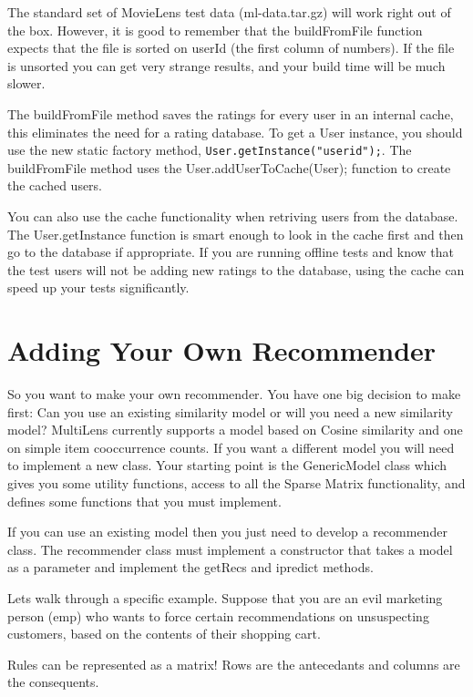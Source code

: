 \documentclass[12pt]{article}
\begin{document}
The standard set of MovieLens test data (ml-data.tar.gz) will work
right out of the box.  However, it is good to remember that the
buildFromFile function expects that the file is sorted on userId (the
first column of numbers).  If the file is unsorted you can get
very strange results, and your build time will be much slower.


The buildFromFile method saves the ratings for every user in an
internal cache, this eliminates the need for a rating database.  To
get a User instance, you should use the new static factory method, 
\lstinline$User.getInstance("userid");$.  The buildFromFile method
uses the User.addUserToCache(User); function to create the cached
users. 

You can also use the cache functionality when retriving users from
the database.  The User.getInstance function is smart enough to look
in the cache first and then go to the database if appropriate.  If you
are running offline tests and know that the test users will not be
adding new ratings to the database, using the cache can speed up your
tests significantly.


\section{Adding Your Own Recommender}
\label{sec:newrec}

So you want to make your own recommender.  You have one big decision
to make first: Can you use an existing similarity model or will you
need a new similarity model?  MultiLens currently supports a model
based on Cosine similarity and one on simple item cooccurrence counts.
If you want a different model you will need to implement a new class.
Your starting point is the GenericModel class which gives you some
utility functions, access to all the Sparse Matrix functionality, and
defines some functions that you must implement.

If you can use an existing model then you just need to develop a
recommender class.  The recommender class must implement a constructor
that takes a model as a parameter and implement the getRecs
and ipredict methods.


Lets walk through a specific example.  Suppose that you are an evil
marketing person (emp) who wants to force certain recommendations on
unsuspecting customers, based on the contents of their shopping cart.

Rules can be represented as a matrix!  Rows are the antecedants and
columns are the consequents.
\end{document}
